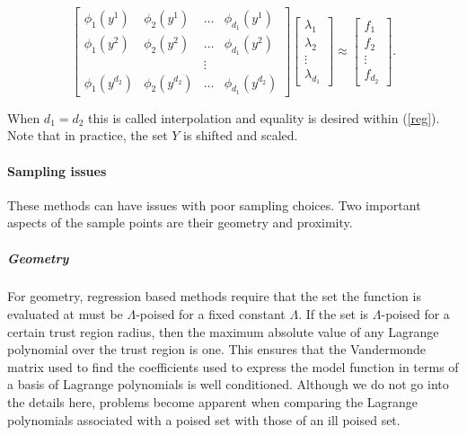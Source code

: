 \documentclass{article}
\let\oldref\ref
\renewcommand{\ref}[1]{(\oldref{#1})}
\begin{document}
\begin{equation}
\label{reg}
\begin{bmatrix}
    \phi_1(y^1)      & \phi_2(y^1)       & \ldots & \phi_{d_1}(y^1)      \\
    \phi_1(y^2)      & \phi_2(y^2)       & \dots  & \phi_{d_1}(y^2)      \\
                     &                   & \vdots &                      \\
    \phi_1(y^{d_2})  & \phi_2(y^{d_2})   & \ldots & \phi_{d_1}(y^{d_2})
\end{bmatrix}
\begin{bmatrix}
    \lambda_1      \\
    \lambda_2      \\
    \vdots         \\            
    \lambda_{d_1}
\end{bmatrix}
\approx
\begin{bmatrix}
    f_1      \\
    f_2      \\
    \vdots         \\            
    f_{d_2}
\end{bmatrix}.
\end{equation}

When $d_1 = d_2$ this is called interpolation and equality is desired within \ref{reg}.
Note that in practice, the set $Y$ is shifted and scaled.

\paragraph{Sampling issues}

These methods can have issues with poor sampling choices.
Two important aspects of the sample points are their geometry and proximity.

\subparagraph{Geometry}
\label{geometry}

For geometry, regression based methods require that the set the function is evaluated at must be $\Lambda$-poised for a fixed constant $\Lambda$.
If the set is $\Lambda$-poised for a certain trust region radius, then the maximum absolute value of any Lagrange polynomial over the trust region is one.
This ensures that the Vandermonde matrix used to find the coefficients used to express the model function in terms of a basis of Lagrange polynomials is well conditioned.
Although we do not go into the details here, problems become apparent when comparing the Lagrange polynomials associated with a poised set with those of an ill poised set.
\end{document}
